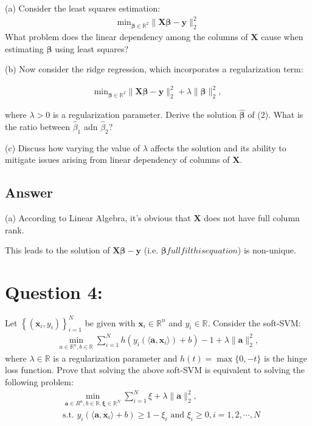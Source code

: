 \documentclass[a4paper,12pt]{article}
\newcommand{\R}{\mathbb{R}}
\begin{document}
(a) Consider the least squares estimation:
\begin{align}
    \text{min}_{\bm{\beta} \in \R^2}\|\bm{X}\bm{\beta} - \bm{y}\|_2^2 
\end{align}
What problem does the linear dependency among the columns of \(\bm{X}\) cause when estimating \(\bm{\beta}\) using least squares?

(b) Now consider the ridge regression, which incorporates a regularization term:

\begin{align}
    \text{min}_{\bm{\beta} \in \R^2}\|\bm{X}\bm{\beta} - \bm{y}\|_2^2 + \lambda\|\bm{\beta}\|_2^2,
\end{align}

where \(\lambda > 0\) is a regularization parameter. Derive the solution \(\hat{\bm{\beta}}\) of (2). What is the ratio between \(\hat{\beta}_1\) adn \(\hat{\beta}_2\)?

(c) Discuss how varying the value of \(\lambda\) affects the solution and its ability to mitigate issues arising from linear dependency of columns of \(\bm{X}\).

\subsection*{Answer}
(a) According to Linear Algebra, it's obvious that \(\bm{X}\) does not have full column rank.

This leads to the solution of \(\bm{X}\bm{\beta} - \bm{y}\) (i.e. \(\bm{\beta} fullfil this equation\)) is non-unique.



\section*{Question 4:}
Let \(\left\{(\bm{x}_i, y_i)\right\}_{i=1}^N\) be given with \(\bm{x}_i \in \R^n\) and \(y_i \in \R\). Consider the soft-SVM:
\begin{align*}
    \min_{a\in\R^n, b\in \R} \sum_{i=1}^N h(y_i(\langle \bm{a}, \bm{x}_i\rangle) + b) - 1 + \lambda\|\bm{a}\|_2^2,
\end{align*}
where \(\lambda \in \R\) is a regularization parameter and \(h(t) = \max\{0, -t\}\) is the hinge loss function. Prove that solving the above soft-SVM is equivalent to solving the following problem:
\begin{align*}
    &\min_{\bm{a} \in R^n, b \in \R, \bm{\xi} \in \R^N} \sum_{i = 1}^N \xi + \lambda\|\bm{a}\|_2^2, \\
    &\text{s.t. } y_i(\langle \bm{a}, \bm{x}_i\rangle + b) \geq 1 - \xi_i \text{ and } \xi_i \geq 0, i = 1,2,\cdots,N
\end{align*}
\end{document}
